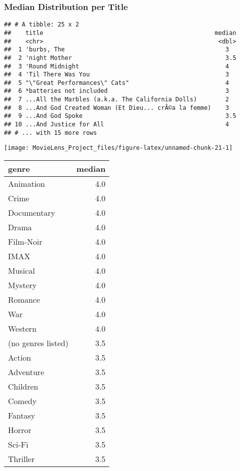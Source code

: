 \documentclass[]{article}
\begin{document}
\hypertarget{median-distribution-per-title}{%
\subsubsection{Median Distribution per
Title}\label{median-distribution-per-title}}

\begin{verbatim}
## # A tibble: 25 x 2
##    title                                                median
##    <chr>                                                 <dbl>
##  1 'burbs, The                                             3  
##  2 'night Mother                                           3.5
##  3 'Round Midnight                                         4  
##  4 'Til There Was You                                      3  
##  5 "\"Great Performances\" Cats"                           4  
##  6 *batteries not included                                 3  
##  7 ...All the Marbles (a.k.a. The California Dolls)        2  
##  8 ...And God Created Woman (Et Dieu... crÃ©a la femme)    3  
##  9 ...And God Spoke                                        3.5
## 10 ...And Justice for All                                  4  
## # ... with 15 more rows
\end{verbatim}

\begin{center}\texttt{[image: MovieLens\_Project\_files/figure-latex/unnamed-chunk-21-1]} \end{center}

\begin{table}[H]
\centering\begingroup\fontsize{10}{12}\selectfont

\begin{tabular}{l|r}
\hline
genre & median\\
\hline
Animation & 4.0\\
\hline
Crime & 4.0\\
\hline
Documentary & 4.0\\
\hline
Drama & 4.0\\
\hline
Film-Noir & 4.0\\
\hline
IMAX & 4.0\\
\hline
Musical & 4.0\\
\hline
Mystery & 4.0\\
\hline
Romance & 4.0\\
\hline
War & 4.0\\
\hline
Western & 4.0\\
\hline
(no genres listed) & 3.5\\
\hline
Action & 3.5\\
\hline
Adventure & 3.5\\
\hline
Children & 3.5\\
\hline
Comedy & 3.5\\
\hline
Fantasy & 3.5\\
\hline
Horror & 3.5\\
\hline
Sci-Fi & 3.5\\
\hline
Thriller & 3.5\\
\hline
\end{tabular}
\endgroup{}
\end{table}
\end{document}
